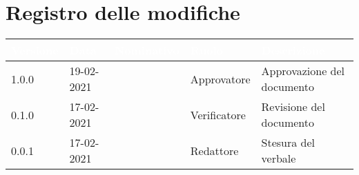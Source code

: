 \section*{Registro delle modifiche}
{
\setcounter{table}{-1}
{
\renewcommand{\arraystretch}{1.5}
\centering
\begin{longtable}{C{1.7cm} C{2.5cm} C{3.2cm} C{2.7cm} C{4.8cm}}
\textcolor{white}{\textbf{Versione}}&
\textcolor{white}{\textbf{Data}}&
\textcolor{white}{\textbf{Nominativo}}&
\textcolor{white}{\textbf{Ruolo}}&
\textcolor{white}{\textbf{Descrizione}}\\	
\endhead

1.0.0 & 19-02-2021 & \Approvatore{} & Approvatore & Approvazione del documento\\	
0.1.0 & 17-02-2021 & \Verificatori{} & Verificatore & Revisione del documento\\		
0.0.1 & 17-02-2021 & \BM{} & Redattore & Stesura del verbale\\
		
\end{longtable}
}
}
